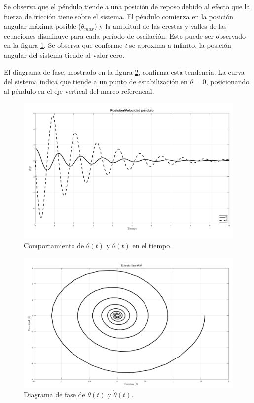 Se observa que el péndulo tiende a una posición de reposo debido
al efecto que la fuerza de fricción tiene sobre el sistema.
El péndulo comienza en la posición angular máxima posible 
($\theta_{max}$) y la amplitud de las crestas y valles de las 
ecuaciones disminuye para cada período de oscilación. 
Esto puede ser observado en la figura \ref{fig: time plot theta dtheta friction}.
Se observa que conforme \emph{t} se aproxima a infinito, 
la posición angular del sistema tiende al valor cero.


El diagrama de fase, mostrado en la figura 
\ref{fig: phase plot theta friction}, confirma esta tendencia.
La curva del sistema indica que tiende 
a un punto de estabilización en $\theta = 0$,
posicionando al péndulo en el eje vertical 
del marco referencial.

\begin{figure}[hb]
 \centering 
 \includegraphics[scale=0.3]{./img/PosVelF.png}
 \caption{Comportamiento de $\theta(t)$ y $\dot{\theta}(t)$ en el tiempo.}
 \label{fig: time plot theta dtheta friction}
\end{figure}

\begin{figure}[hb]
 \centering 
 \includegraphics[scale=0.3]{./img/faseF.png}
\caption{Diagrama de fase de $\theta(t)$ y $\dot{\theta}(t)$.}
 \label{fig: phase plot theta friction}
\end{figure}
